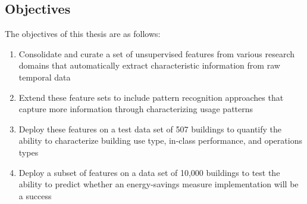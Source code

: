 \subsection{Objectives}
The objectives of this thesis are as follows:
\begin{enumerate}
\item Consolidate and curate a set of unsupervised features from various research domains that automatically extract characteristic information from raw temporal data
\item Extend these feature sets to include pattern recognition approaches that capture more information through characterizing usage patterns
\item Deploy these features on a test data set of 507 buildings to quantify the ability to characterize building use type, in-class performance, and operations types
\item Deploy a subset of features on a data set of 10,000 buildings to test the ability to predict whether an energy-savings measure implementation will be a success 
\end{enumerate}